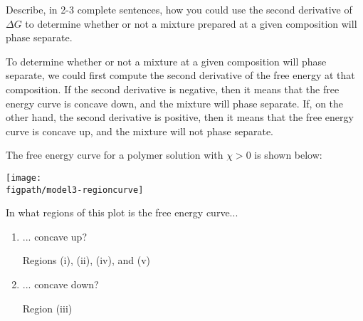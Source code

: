\begin{activity}
\begin{ctqs}
		\question Describe, in 2-3 complete sentences, how you could use the second derivative of $\Delta G$ to determine whether or not a mixture prepared at a given composition will phase separate.
					
					\begin{solution}[3in]
					
						To determine whether or not a mixture at a given composition will phase separate, we could first compute the second derivative of the free energy at that composition.  If the second derivative is negative, then it means that the free energy curve is concave down, and the mixture will phase separate.  If, on the other hand, the second derivative is positive, then it means that the free energy curve is concave up, and the mixture will not phase separate.
					
					\end{solution}
					
\end{ctqs}

\clearpage
\begin{model}
\label{\labelbase:mdl:phaseboundaries}

The free energy curve for a polymer solution with $\chi > 0$ is shown below:

\centerline{\texttt{[image: \\figpath/model3-regioncurve]}}

\end{model}

\begin{ctqs}

		\question \label{ctq:regionconcavity} In what regions of this plot is the free energy curve...
			\begin{enumerate}
				\item ... concave up?
					
					\begin{solution}[0.75in]
					
						Regions (i), (ii), (iv), and (v)
						
					\end{solution}
				\item ... concave down?
					
					\begin{solution}[0.75in]
					
						Region (iii)
						
					\end{solution}
					

\end{enumerate}
\end{ctqs}
\end{activity}
